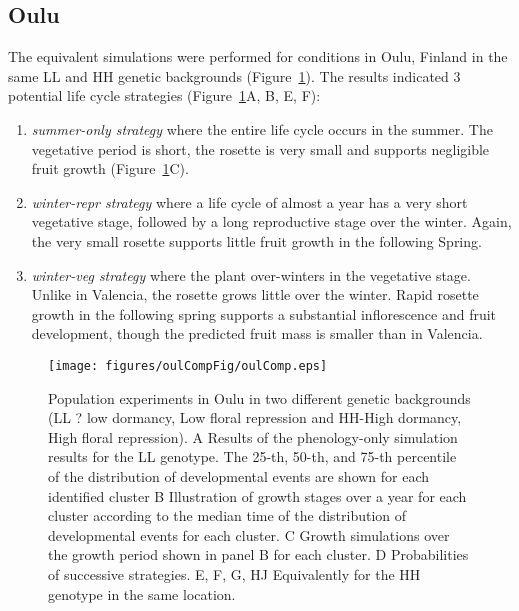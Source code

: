 \subsection{Oulu}
\label{oulu}
The equivalent simulations were performed for conditions in Oulu,
Finland in the same LL and HH genetic backgrounds (Figure~\ref{fig:oulComp}). The
results indicated 3 potential life cycle strategies (Figure~\ref{fig:oulComp}A, B, E,
F):

\begin{enumerate}
\def\labelenumi{\arabic{enumi}.}
\item
  \emph{summer-only strategy} where the entire life cycle occurs in the
  summer. The vegetative period is short, the rosette is very small and
  supports negligible fruit growth (Figure~\ref{fig:oulComp}C).
\item
  \emph{winter-repr strategy} where a life cycle of almost a year has a
  very short vegetative stage, followed by a long reproductive stage
  over the winter. Again, the very small rosette supports little fruit
  growth in the following Spring.
\item
  \emph{winter-veg strategy} where the plant over-winters in the
  vegetative stage. Unlike in Valencia, the rosette grows little over
  the winter. Rapid rosette growth in the following spring supports a
  substantial inflorescence and fruit development, though the predicted
  fruit mass is smaller than in Valencia.
\end{enumerate}

\begin{figure}[p]
\centering
\texttt{[image: figures/oulCompFig/oulComp.eps]}
\caption{Population experiments in Oulu in two different genetic backgrounds (LL
  ? low dormancy, Low floral repression and HH-High dormancy, High floral
  repression). A Results of the phenology-only simulation results for the LL
  genotype. The 25-th, 50-th, and 75-th percentile of the distribution of
  developmental events are shown for each identified cluster B Illustration of
  growth stages over a year for each cluster according to the median time of the
  distribution of developmental events for each cluster. C Growth simulations
  over the growth period shown in panel B for each cluster.  D Probabilities of
  successive strategies. E, F, G, HJ Equivalently for the HH genotype in the
  same location.}
\label{fig:oulComp}
\end{figure}

